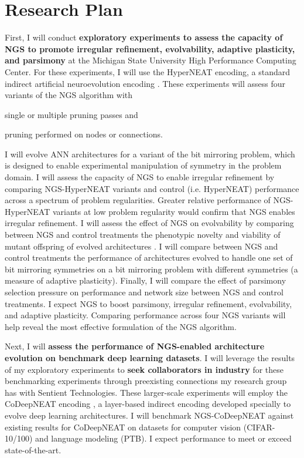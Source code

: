 \section{Research Plan}

First, I will conduct \textbf{exploratory experiments to assess the capacity of NGS to promote irregular refinement, evolvability, adaptive plasticity, and parsimony} at the Michigan State University High Performance Computing Center.
For these experiments, I will use the HyperNEAT encoding, a standard indirect artificial neuroevolution encoding \cite{clune2011performance}.
These experiments will assess four variants of the NGS algorithm with
\begin{enumerate*}[label=(\alph*)]
\item single or multiple pruning passes and
\item pruning performed on nodes or connections.
\end{enumerate*}
I will evolve ANN architectures for a variant of the bit mirroring problem, which is designed to enable experimental manipulation of symmetry in the problem domain.
I will assess the capacity of NGS to enable irregular refinement by comparing NGS-HyperNEAT variants and control (i.e. HyperNEAT) performance across a spectrum of problem regularities.
Greater relative performance of NGS-HyperNEAT variants at low problem regularity would confirm that NGS enables irregular refinement.
I will assess the effect of NGS on evolvability by comparing between NGS and control treatments the phenotypic novelty and viability of mutant offspring of evolved architectures \cite{tarapore2015evolvability}.
I will compare between NGS and control treatments the performance of architectures evolved to handle one set of bit mirroring symmetries on a bit mirroring problem with different symmetries (a measure of adaptive plasticity).
Finally, I will compare the effect of parsimony selection pressure on performance and network size between NGS and control treatments.
I expect NGS to boost parsimony, irregular refinement, evolvability, and adaptive plasticity.
Comparing performance across four NGS variants will help reveal the most effective formulation of the NGS algorithm.

Next, I will \textbf{assess the performance of NGS-enabled architecture evolution on benchmark deep learning datasets}.
I will leverage the results of my exploratory experiments to \textbf{seek collaborators in industry} for these benchmarking experiments through preexisting connections my research group has with Sentient Technologies.
These larger-scale experiments will employ the CoDeepNEAT encoding \cite{miikkulainen2017evolving}, a layer-based indirect encoding developed specially to evolve deep learning architectures.
I will benchmark NGS-CoDeepNEAT against existing results for CoDeepNEAT on datasets for computer vision (CIFAR-10/100) and language modeling (PTB).
I expect performance to meet or exceed state-of-the-art.

